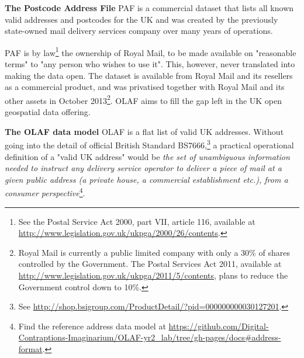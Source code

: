 \textbf{The Postcode Address File} PAF is a commercial dataset that lists all known valid addresses and postcodes for the UK and was created by the previously state-owned mail delivery services company over many years of operations.

PAF is by law\footnote{See the Postal Service Act 2000, part VII, article 116, available at \url{http://www.legislation.gov.uk/ukpga/2000/26/contents}.} the ownership of Royal Mail, to be made available on "reasonable terms" to "any person who wishes to use it". This, however, never translated into making the data open. The dataset is available from Royal Mail and its resellers as a commercial product, and was privatised together with Royal Mail and its other assets in October 2013\footnote{Royal Mail is currently a public limited company with only a 30\% of shares controlled by the Government. The Postal Services Act 2011, available at \url{http://www.legislation.gov.uk/ukpga/2011/5/contents}, plans to reduce the Government control down to 10\%.}. OLAF aims to fill the gap left in the UK open geospatial data offering. 

\textbf{The OLAF data model} OLAF is a flat list of valid UK addresses. Without going into the detail of official British Standard BS7666,\footnote{See \url{http://shop.bsigroup.com/ProductDetail/?pid=000000000030127201}.} a practical operational definition of a "valid UK address" would be {\it the set of unambiguous information needed to instruct any delivery service operator to deliver a piece of mail at a given public address (a private house, a commercial establishment etc.), from a consumer perspective}\footnote{Find the reference address data model at \url{https://github.com/Digital-Contraptions-Imaginarium/OLAF-yr2_lab/tree/gh-pages/docs#address-format}.}. 
